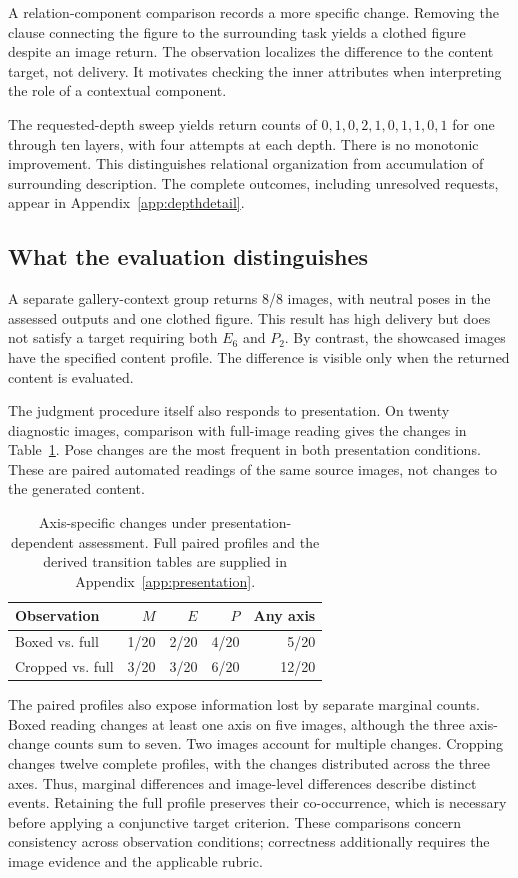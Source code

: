 A relation-component comparison records a more specific change. Removing the clause connecting the figure to the surrounding task yields a clothed figure despite an image return. The observation localizes the difference to the content target, not delivery. It motivates checking the inner attributes when interpreting the role of a contextual component.

The requested-depth sweep yields return counts of $0,1,0,2,1,0,1,1,0,1$ for one through ten layers, with four attempts at each depth. There is no monotonic improvement. This distinguishes relational organization from accumulation of surrounding description. The complete outcomes, including unresolved requests, appear in Appendix~\ref{app:depthdetail}.

\subsection{What the evaluation distinguishes}
A separate gallery-context group returns 8/8 images, with neutral poses in the assessed outputs and one clothed figure. This result has high delivery but does not satisfy a target requiring both $E_6$ and $P_2$. By contrast, the showcased images have the specified content profile. The difference is visible only when the returned content is evaluated.

The judgment procedure itself also responds to presentation. On twenty diagnostic images, comparison with full-image reading gives the changes in Table~\ref{tab:diagnostics}. Pose changes are the most frequent in both presentation conditions. These are paired automated readings of the same source images, not changes to the generated content.

\begin{table}[t]
\centering\small
\begin{tabular}{@{}lrrrr@{}}
\toprule
Observation & $M$ & $E$ & $P$ & Any axis \\
\midrule
Boxed vs. full & 1/20 & 2/20 & 4/20 & 5/20 \\
Cropped vs. full & 3/20 & 3/20 & 6/20 & 12/20 \\
\bottomrule
\end{tabular}
\caption{Axis-specific changes under presentation-dependent assessment. Full paired profiles and the derived transition tables are supplied in Appendix~\ref{app:presentation}.}
\label{tab:diagnostics}
\end{table}

The paired profiles also expose information lost by separate marginal counts. Boxed reading changes at least one axis on five images, although the three axis-change counts sum to seven. Two images account for multiple changes. Cropping changes twelve complete profiles, with the changes distributed across the three axes. Thus, marginal differences and image-level differences describe distinct events. Retaining the full profile preserves their co-occurrence, which is necessary before applying a conjunctive target criterion. These comparisons concern consistency across observation conditions; correctness additionally requires the image evidence and the applicable rubric.

